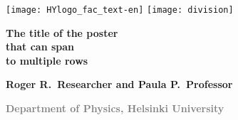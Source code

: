 \documentclass[portrait,a1]{a0poster}
\begin{document}

\vspace*{\fill} %

\begin{minipage}[t]{0.98\linewidth} %
\vspace{0pt} %

\vspace{0.008\linewidth} %

\begin{minipage}[t]{0.28\linewidth} %
\vspace{0pt} %
\centering
\texttt{[image: HYlogo\_fac\_text-en]}
\texttt{[image: division]}

\end{minipage} %
\begin{minipage}[t]{0.7\linewidth} %
\vspace{0pt} %

{\renewcommand{\baselinestretch}{0.85} %
\Huge{\textbf{\textsf{The title of the poster\\ that can span\\ to multiple rows}}} %
\par} %


\vspace{0.04\linewidth} %

\normalsize{\textsf{\bfseries{Roger R.\ Researcher and Paula P.\ Professor}}} %

\textcolor{gray}{\textsf{\bfseries{Department of Physics, Helsinki University}}}
%
\end{minipage}
\end{minipage}


\vfill %
\end{document}
